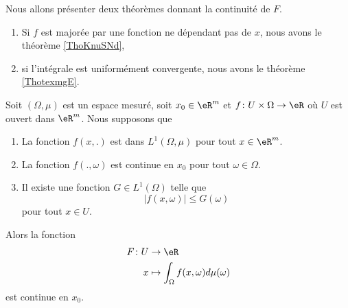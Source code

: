 Nous allons présenter deux théorèmes donnant la continuité de \( F\).
\begin{enumerate}
    \item
        Si \( f\) est majorée par une fonction ne dépendant pas de \( x\), nous avons le théorème \ref{ThoKnuSNd},
    \item
        si l'intégrale est uniformément convergente, nous avons le théorème \ref{ThotexmgE}.
\end{enumerate}

\begin{theorem} \label{ThoKnuSNd}
    Soit \( (\Omega,\mu)\) est un espace mesuré, soit \( x_0\in \eR^m\) et \( f\colon U\times \Omega\to \eR\) où \( U\) est ouvert dans \( \eR^m\). Nous supposons que
    \begin{enumerate}
        \item
            La fonction \( f(x,.)\) est dans \( L^1(\Omega,\mu)\) pour tout \( x \in \eR^m\).
        \item
            La fonction \( f(.,\omega)\) est continue en \( x_0\) pour tout \( \omega\in\Omega\).
        \item       \label{ItemNAuYNG}
            Il existe une fonction \( G\in L^1(\Omega)\) telle que
            \begin{equation}
                | f(x,\omega) |\leq G(\omega)
            \end{equation}
            pour tout \( x\in U\).
    \end{enumerate}
    Alors la fonction 
    \begin{equation}
        \begin{aligned}
            F\colon U&\to \eR \\
            x&\mapsto \int_{\Omega}f(x,\omega)d\mu(\omega) 
        \end{aligned}
    \end{equation}
    est continue en \( x_0\).
\end{theorem}

